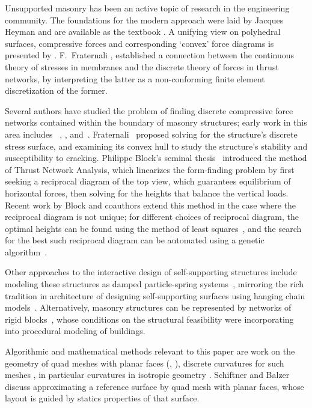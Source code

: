 \documentclass[annual]{acmsiggraph}
\begin{document}
Unsupported masonry has been an active topic of research in the 
engineering community. The foundations for the modern approach were laid 
by Jacques Heyman  and are available as the textbook 
\cite{Heyman95}. A unifying view on polyhedral surfaces, compressive 
forces and corresponding `convex' force diagrams is presented by 
\cite{Ash1988}. F.~Fraternali , 
 established a connection between the continuous 
theory of stresses in membranes and the discrete theory of forces in 
thrust networks, by interpreting the latter as a non-conforming finite 
element discretization of the former.

Several authors have studied the problem of finding discrete compressive 
force networks contained within the boundary of masonry structures; early 
work in this area includes \ \cite{schek74}, \cite{Livesley92}, and\ 
\cite{O'Dwyer98}. Fraternali~ proposed solving 
for the structure's discrete stress surface, and examining its convex hull 
to study the structure's stability and susceptibility to cracking. 
Philippe Block's seminal thesis~\shortcite{Block07} introduced the method 
of Thrust Network Analysis, which linearizes the form-finding problem by 
first seeking a reciprocal diagram of the top view, which guarantees 
equilibrium of horizontal forces, then solving for the heights that 
balance the vertical loads. Recent work by Block and coauthors extend this 
method in the case where the reciprocal diagram is not unique; for 
different choices of reciprocal diagram, the optimal heights can be found 
using the method of least squares~\cite{vanmele2011}, and the search for 
the best such reciprocal diagram can be automated using a genetic 
algorithm~\cite{Block2011}.

Other approaches to the interactive design of self-supporting structures 
include modeling these structures as damped particle-spring 
systems~\cite{Kilian2005,barnes09}, mirroring the rich tradition in architecture of 
designing self-supporting surfaces using hanging chain 
models~\cite{Heyman98}. Alternatively, masonry structures can be 
represented by networks of rigid blocks~\cite{Whiting09}, whose conditions 
on the structural feasibility were incorporating into procedural modeling 
of buildings.

Algorithmic and mathematical methods relevant to this paper are work on 
the geometry of quad meshes with planar faces (\cite{Glymph2004}, 
\cite{Liu2006}), discrete curvatures for such meshes \cite{Pottmann2007b}, 
in particular curvatures in isotropic geometry \cite{Pottmann2007}. 
Schiftner and Balzer \shortcite{Schiftner2010} discuss approximating a 
reference surface by quad mesh with planar faces, whose layout is guided 
by statics properties of that surface.
\end{document}
